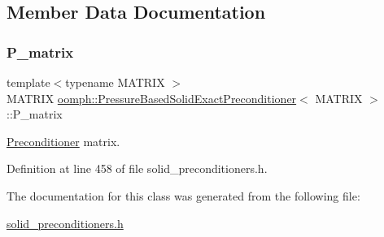\subsection{Member Data Documentation}
\mbox{\label{classoomph_1_1PressureBasedSolidExactPreconditioner_a4fc2a6a063affff56ae040896cedbb2b}} 
\subsubsection{\texorpdfstring{P\+\_\+matrix}{P\_matrix}}
{\footnotesize\ttfamily template$<$typename M\+A\+T\+R\+IX $>$ \\
M\+A\+T\+R\+IX \hyperlink{classoomph_1_1PressureBasedSolidExactPreconditioner}{oomph\+::\+Pressure\+Based\+Solid\+Exact\+Preconditioner}$<$ M\+A\+T\+R\+IX $>$\+::P\+\_\+matrix\hspace{0.3cm}{\ttfamily [protected]}}



\hyperlink{classoomph_1_1Preconditioner}{Preconditioner} matrix. 



Definition at line 458 of file solid\+\_\+preconditioners.\+h.



The documentation for this class was generated from the following file\+:\begin{DoxyCompactItemize}
\item 
\hyperlink{solid__preconditioners_8h}{solid\+\_\+preconditioners.\+h}\end{DoxyCompactItemize}
